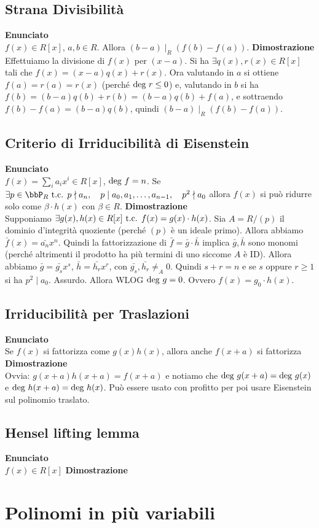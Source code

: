 \documentclass[a4paper,NoNotes,GeneralMath]{stdmdoc}
\newcommand{\opp}{\text{ oppure }}
\newcommand{\Enunciato}{\vskip 0.05cm \noindent \textbf{Enunciato} \\ }
\renewcommand{\Dimostrazione}{\vskip 0.05cm \noindent \textbf{Dimostrazione} \\ }
\begin{document}
	\subsection{Strana Divisibilità}
	\Enunciato $f(x) \in R[x]$, $a, b \in R$. Allora $(b-a) \mid_R (f(b) - f(a))$.
	\Dimostrazione Effettuiamo la divisione di $f(x)$ per $(x-a)$. Si ha $\exists q(x), r(x) \in R[x]$ tali che $f(x) = (x-a)q(x) + r(x)$. Ora valutando in $a$ si ottiene $f(a) = r(a) = r(x)$ (perché $\mbox{deg } r \le 0$) e, valutando in $b$ si ha $f(b) = (b-a)q(b) + r(b) = (b-a)q(b) + f(a)$, e sottraendo $f(b)-f(a) = (b-a) q(b)$, quindi $(b-a) \mid_R (f(b)-f(a))$.

	\subsection{Criterio di Irriducibilità di Eisenstein}
	\Enunciato $f(x) = \sum_i a_i x^i \in R[x]$, $\mbox{deg } f = n$. Se $\exists p \in \bbP_R \tc p \nmid a_n, \quad p \mid a_0, a_1, \ldots, a_{n-1}, \quad p^2 \nmid a_0$ allora $f(x)$ si può ridurre solo come $\beta \cdot h(x)$ con $\beta \in R$.
	\Dimostrazione Supponiamo $\exists g(x), h(x) \in R[x] \mbox{ t.c. } f(x) = g(x) \cdot h(x)$. Sia $A = R/(p)$ il dominio d'integrità quoziente (perché $(p)$ è un ideale primo). Allora abbiamo $\bar{f}(x) = \bar{a_n}x^n$. Quindi la fattorizzazione di $\bar{f} = \bar{g} \cdot \bar{h}$ implica $\bar{g}, \bar{h}$ sono monomi (perché altrimenti il prodotto ha più termini di uno siccome $A$ è ID). Allora abbiamo $\bar{g} = \bar{g_s}x^s$, $\bar{h} = \bar{h_r}x^r$, con $\bar{g_s}, \bar{h_r} \neq_A 0$. Quindi $s+r = n$ e se $s \opp r \ge 1$ si ha $p^2 \mid a_0$. Assurdo. Allora WLOG $\mbox{deg } g = 0$. Ovvero $f(x) = g_0 \cdot h(x)$.

	\subsection{Irriducibilità per Traslazioni}
	\Enunciato Se $f(x)$ si fattorizza come $g(x)h(x)$, allora anche $f(x+a)$ si fattorizza
	\Dimostrazione Ovvia: $g(x+a)h(x+a) = f(x+a)$ e notiamo che $\mbox{deg } g(x+a) = \mbox{deg } g(x)$ e $\mbox{deg } h(x+a) = \mbox{deg } h(x)$. Può essere usato con profitto per poi usare Eisenstein sul polinomio traslato.

	\subsection{Hensel lifting lemma}
	\Enunciato $f(x) \in R[x]$
	\Dimostrazione

	\section*{Polinomi in più variabili}
\end{document}
